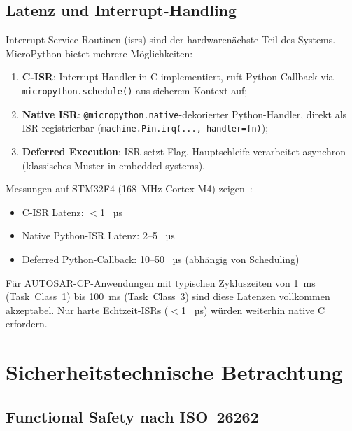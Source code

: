 ﻿\documentclass[12pt,a4paper,twoside]{article}
\begin{document}
\subsection{Latenz und Interrupt-Handling}

\label{subsec:latenz}

Interrupt-Service-Routinen (\glspl{isr}) sind der hardwarenächste Teil des Systems.
MicroPython bietet mehrere Möglichkeiten:

\begin{enumerate}
  \item \textbf{C-ISR}: Interrupt-Handler in C implementiert, ruft Python-Callback
        via \texttt{micropython.\newline schedule()} aus sicherem Kontext auf;
  \item \textbf{Native ISR}: \texttt{@micropython.native}-dekorierter Python-Handler,
        direkt als ISR registrierbar (\texttt{machine.Pin.irq(..., handler=fn)});
  \item \textbf{Deferred Execution}: ISR setzt Flag, Hauptschleife verarbeitet
        asynchron (klassisches Muster in embedded systems).
\end{enumerate}

Messungen auf STM32F4 (168~MHz Cortex-M4) zeigen~\cite{micropython_irq_bench2022}:
\begin{itemize}
  \item C-ISR Latenz: $<$1~ µs
  \item Native Python-ISR Latenz: 2--5~ µs
  \item Deferred Python-Callback: 10--50~ µs (abhängig von Scheduling)
\end{itemize}

Für AUTOSAR-CP-Anwendungen mit typischen Zykluszeiten von
1~ms (Task~Class~1) bis 100~ms (Task~Class~3) sind diese Latenzen
vollkommen akzeptabel. Nur harte Echtzeit-ISRs ($<$1~ µs) würden
weiterhin native C erfordern.

\section{Sicherheitstechnische Betrachtung}
\label{sec:sicherheit}

\subsection{Functional Safety nach ISO~26262}
\label{subsec:fusa}
\end{document}

